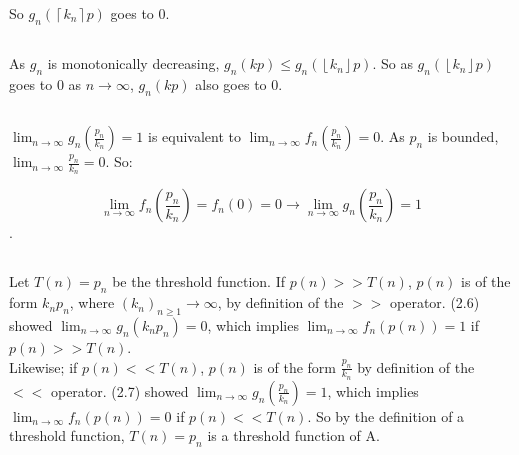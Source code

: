 \documentclass{article}
\begin{document}
So $g_n(\left \lceil{k_n}\right \rceil p)$ goes to 0.

\subsection{}
As $g_n$ is monotonically decreasing, $g_n(kp) \le g_n(\left \lfloor{k_n}\right \rfloor p)$. So as $g_n(\left \lfloor{k_n}\right \rfloor p)$ goes to 0 as $n \to \infty$, $g_n(kp)$ also goes to 0.

\subsection{}
$\lim_{n\to\infty} g_n(\frac{p_n}{k_n}) = 1$ is equivalent to $\lim_{n\to\infty} f_n\left(\frac{p_n}{k_n}\right)=0$. As $p_n$ is bounded, $\lim_{n\to\infty} \frac{p_n}{k_n} = 0$. So:

$$\lim_{n\to\infty} f_n\left(\frac{p_n}{k_n}\right) = f_n(0) = 0 \rightarrow \lim_{n\to\infty} g_n\left(\frac{p_n}{k_n}\right) = 1$$.

\subsection{}
Let $T(n) = p_n$ be the threshold function. If $p(n) >> T(n)$, $p(n)$ is of the form $k_n p_n$, where $(k_n)_{n \ge 1} \to \infty$, by definition of the $>>$ operator. (2.6) showed $\lim_{n\to\infty} g_n(k_n p_n) = 0$, which implies $\lim_{n\to\infty} f_n(p(n)) = 1$ if $p(n) >> T(n)$.\\

Likewise; if $p(n) << T(n)$, $p(n)$ is of the form $\frac{p_n}{k_n}$ by definition of the $<<$ operator. (2.7) showed $\lim_{n\to\infty} g_n(\frac{p_n}{k_n}) = 1$, which implies $\lim_{n\to\infty} f_n(p(n)) = 0$ if $p(n) << T(n)$. So by the definition of a threshold function, $T(n) = p_n$ is a threshold function of A.
\end{document}
